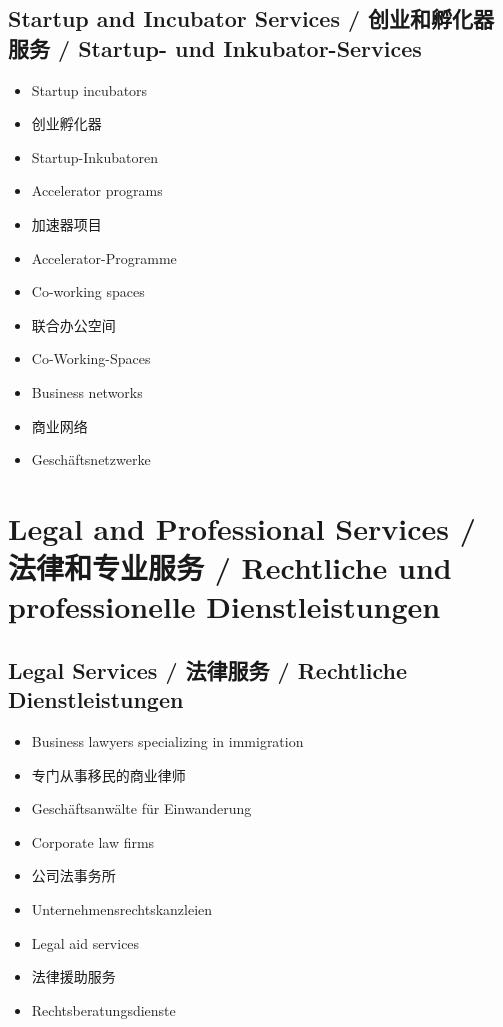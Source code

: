 \subsection{Startup and Incubator Services / 创业和孵化器服务 / Startup- und Inkubator-Services}
\begin{itemize}
    \item Startup incubators
    \item 创业孵化器
    \item Startup-Inkubatoren
    \item Accelerator programs
    \item 加速器项目
    \item Accelerator-Programme
    \item Co-working spaces
    \item 联合办公空间
    \item Co-Working-Spaces
    \item Business networks
    \item 商业网络
    \item Geschäftsnetzwerke
\end{itemize}

\section{Legal and Professional Services / 法律和专业服务 / Rechtliche und professionelle Dienstleistungen}

\subsection{Legal Services / 法律服务 / Rechtliche Dienstleistungen}
\begin{itemize}
    \item Business lawyers specializing in immigration
    \item 专门从事移民的商业律师
    \item Geschäftsanwälte für Einwanderung
    \item Corporate law firms
    \item 公司法事务所
    \item Unternehmensrechtskanzleien
    \item Legal aid services
    \item 法律援助服务
    \item Rechtsberatungsdienste
\end{itemize}

